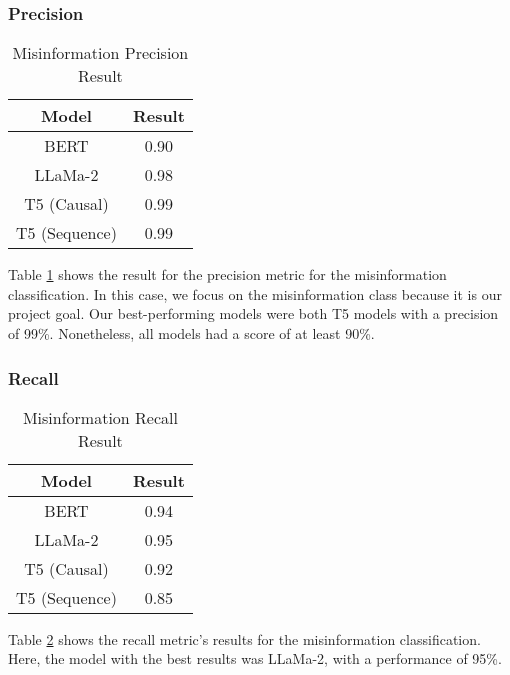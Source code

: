 \subsubsection{Precision}
\begin{table}[H]
	\centering
	\caption{Misinformation Precision Result}
	{\footnotesize
	\begin{tabular}{||c | c||} 
		\hline
		\textbf{Model} & \textbf{Result} \\  
		\hline
		BERT & 0.90  \\
		\hline
		LLaMa-2 & 0.98 \\ 
		\hline
		T5 (Causal) & 0.99 \\
		\hline
		T5 (Sequence) & 0.99 \\
		\hline
	\end{tabular}
	}
	\label{table:MisinformationPrecision}
\end{table}

Table \ref{table:MisinformationPrecision} shows the result for the precision metric for the misinformation classification. In this case, we focus on the misinformation
class because it is our project goal. Our best-performing models were both T5 models with a precision of 99\%. Nonetheless, all models had a score of at least 90\%.

\subsubsection{Recall}
\begin{table}[H]
	\centering
	\caption{Misinformation Recall Result}
	{\footnotesize
	\begin{tabular}{||c | c||} 
		\hline
		\textbf{Model} & \textbf{Result} \\ 
		\hline
		BERT & 0.94  \\
		\hline
		LLaMa-2 & 0.95 \\ 
		\hline
		T5 (Causal) & 0.92 \\
		\hline
		T5 (Sequence) & 0.85 \\
		\hline
	\end{tabular}
	}
	\label{table:MisinformationRecall}
\end{table}

Table \ref{table:MisinformationRecall} shows the recall metric's results for the misinformation classification. 
Here, the model with the best results was LLaMa-2,
with a performance of 95\%. 


